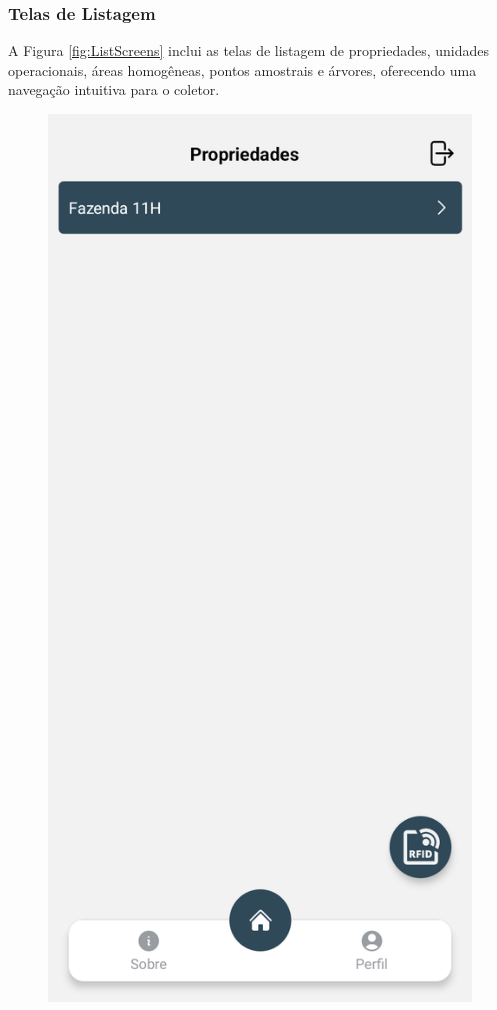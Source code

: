 \subsubsection{Telas de Listagem}
A Figura \ref{fig:ListScreens} inclui as telas de listagem de propriedades, unidades operacionais, áreas homogêneas, pontos amostrais e árvores, oferecendo uma navegação intuitiva para o coletor.

\begin{figure}[H]
    \centering
    \begin{minipage}[b]{0.30\textwidth}
        \centering
        \includegraphics[width=\textwidth]{images/app/03-properties.png}

\end{minipage}
\end{figure}

